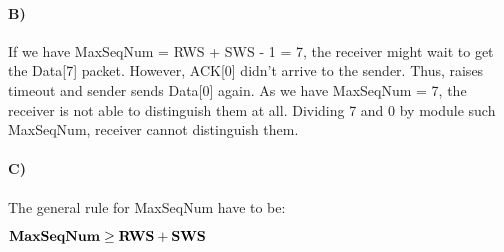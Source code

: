 \documentclass[12pt]{article}
\begin{document}
        \paragraph{B)} If we have MaxSeqNum = RWS + SWS - 1 = 7, the receiver might wait to get the Data[7] packet.
        However, ACK[0] didn't arrive to the sender.
        Thus, raises timeout and sender sends Data[0] again.
        As we have MaxSeqNum = 7, the receiver is not able to distinguish them at all.
    Dividing 7 and 0 by module such MaxSeqNum, receiver cannot distinguish them.
        \paragraph{C)} The general rule for MaxSeqNum have to be:
        \begin{center}
               $\bf MaxSeqNum \geq RWS + SWS$
        \end{center}
\end{document}
